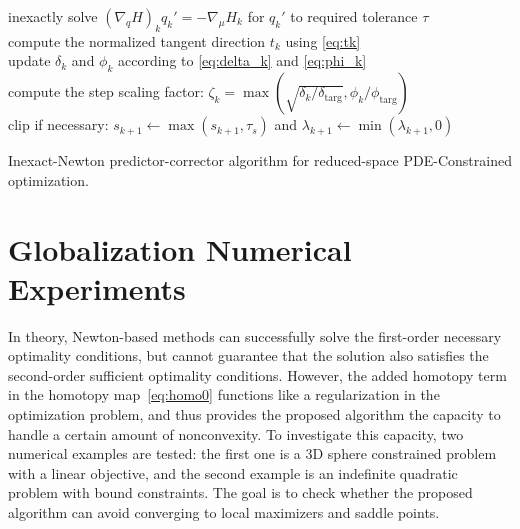 \begin{algorithm}[H]
{  
  \ShowLn
   inexactly solve $\left(\nabla_q H\right)_{k} q_{k}' = - \nabla_\mu H_{k}$
  for $q_{k}'$ to required tolerance $\tau$   \label{line:tang} \\
  compute the normalized tangent direction $t_{k}$ using \eqref{eq:tk} \\
  update $\delta_k$ and $\phi_{k}$ according to \eqref{eq:delta_k} and
  \eqref{eq:phi_k} \\
  compute the step scaling factor: $\zeta_{k} = \max\left( \sqrt{\delta_k/\delta_{\text{targ}}}, \phi_k / \phi_{\text{targ}} \right)$\\
  clip if necessary: $s_{k+1} \leftarrow \max(s_{k+1},\tau_s)$ and
  $\lambda_{k+1} \leftarrow \min(\lambda_{k+1},0)$ \\
  }
\caption{Inexact-Newton predictor-corrector algorithm for reduced-space PDE-Constrained
  optimization.\label{alg:pc}}
\end{algorithm}

\newpage
\section{Globalization Numerical Experiments}
In theory, Newton-based methods can successfully solve the first-order necessary optimality conditions, but cannot guarantee that the solution also satisfies the second-order sufficient optimality conditions. However, the added homotopy term in the homotopy map~\eqref{eq:homo0} functions like a regularization in the optimization problem, and thus provides  the proposed algorithm 
the capacity to handle a certain amount of nonconvexity. 
To investigate this capacity, two numerical examples are tested: the first one is a 3D sphere constrained problem with a linear objective, and the second example is an indefinite quadratic problem with bound constraints. The goal is to check whether the proposed algorithm can avoid converging to local maximizers and saddle points.  


